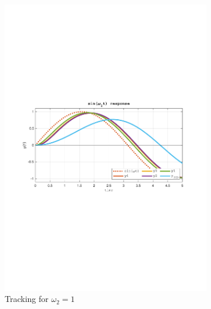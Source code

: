 \documentclass[a4paper, 12pt]{article}
\begin{document}
\begin{figure}[h!]
\begin{subfigure}[t]{0.60\textwidth}
           \includegraphics[width=\textwidth]{Figures/fig07c.pdf}
           \caption{Tracking for $\omega_2 = 1$}
           \label{fig:fig07c}
       \end{subfigure}
    \begin{subfigure}[t]{0.4\textwidth}

\end{subfigure}
\end{figure}
\end{document}
